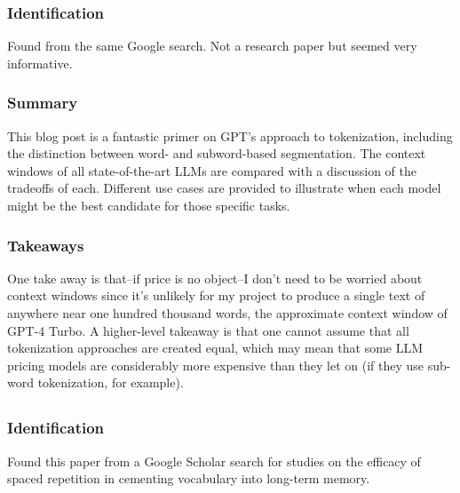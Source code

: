 \documentclass[
	letterpaper, %
]{jdf}
\begin{document}
\subsubsection{Identification}
Found from the same Google search. Not a research paper but seemed very informative.

\subsubsection{Summary}
This blog post is a fantastic primer on GPT's approach to tokenization, including the distinction between word- and subword-based segmentation. The context windows of all state-of-the-art LLMs are compared with a discussion of the tradeoffs of each. Different use cases are provided to illustrate when each model might be the best candidate for those specific tasks.

\subsubsection{Takeaways}
One take away is that–if price is no object–I don't need to be worried about context windows since it's unlikely for my project to produce a single text of anywhere near one hundred thousand words, the approximate context window of GPT-4 Turbo. A higher-level takeaway is that one cannot assume that all tokenization approaches are created equal, which may mean that some LLM pricing models are considerably more expensive than they let on (if they use sub-word tokenization, for example).

\subsection{}
\subsubsection{Identification}
Found this paper from a Google Scholar search for studies on the efficacy of spaced repetition in cementing vocabulary into long-term memory.
\end{document}
